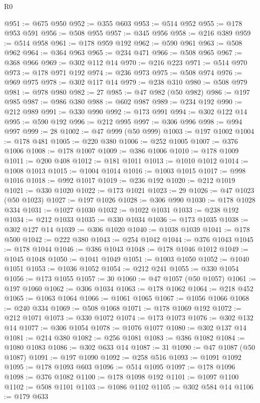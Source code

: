 \begin{lexlean}{R0}
\begin{coremodule}
@951 := @675 @950
@952 := @355 @603
@953 := @514 @952
@955 := @178 @953 @591
@956 := @508 @955
@957 := @345 @956
@958 := @216 @389
@959 := @514 @958
@961 := @178 @959 @192
@962 := @590 @961
@963 := @508 @962
@964 := @364 @963
@965 := @234 @471
@966 := @508 @965
@967 := @368 @966
@969 := @302 @112 @14
@970 := @216 @223
@971 := @514 @970
@973 := @178 @971 @192
@974 := @236 @973
@975 := @508 @974
@976 := @969 @975
@978 := @302 @117 @14
@979 := @238 @310
@980 := @508 @979
@981 := @978 @980
@982 := 27
@985 := @47 @982 (@50 @982)
@986 := @197 @985
@987 := @986 @380
@988 := @602 @987
@989 := @234 @192
@990 := @212 @989
@991 := @330 @990
@992 := @173 @991
@994 := @302 @122 @14
@995 := @590 @192
@996 := @212 @995
@997 := @306 @996
@998 := @994 @997
@999 := 28
@1002 := @47 @999 (@50 @999)
@1003 := @197 @1002
@1004 := @178 @481
@1005 := @220 @380
@1006 := @252 @1005
@1007 := @376 @1006
@1008 := @178 @1007
@1009 := @386 @1006
@1010 := @178 @1009
@1011 := @200 @408
@1012 := @181 @1011
@1013 := @1010 @1012
@1014 := @1008 @1013
@1015 := @1004 @1014
@1016 := @1003 @1015
@1017 := @998 @1016
@1018 := @992 @1017
@1019 := @236 @192
@1020 := @212 @1019
@1021 := @330 @1020
@1022 := @173 @1021
@1023 := 29
@1026 := @47 @1023 (@50 @1023)
@1027 := @197 @1026
@1028 := @306 @990
@1030 := @178 @1028 @334
@1031 := @1027 @1030
@1032 := @1022 @1031
@1033 := @238 @192
@1034 := @212 @1033
@1035 := @330 @1034
@1036 := @173 @1035
@1038 := @302 @127 @14
@1039 := @306 @1020
@1040 := @1038 @1039
@1041 := @178 @500
@1042 := @222 @380
@1043 := @254 @1042
@1044 := @376 @1043
@1045 := @178 @1044
@1046 := @386 @1043
@1048 := @178 @1046 @1012
@1049 := @1045 @1048
@1050 := @1041 @1049
@1051 := @1003 @1050
@1052 := @1040 @1051
@1053 := @1036 @1052
@1054 := @212 @241
@1055 := @330 @1054
@1056 := @173 @1055
@1057 := 30
@1060 := @47 @1057 (@50 @1057)
@1061 := @197 @1060
@1062 := @306 @1034
@1063 := @178 @1062
@1064 := @218 @452
@1065 := @1063 @1064
@1066 := @1061 @1065
@1067 := @1056 @1066
@1068 := @240 @334
@1069 := @508 @1068
@1071 := @178 @1069 @192
@1072 := @212 @1071
@1073 := @330 @1072
@1074 := @173 @1073
@1076 := @302 @132 @14
@1077 := @306 @1054
@1078 := @1076 @1077
@1080 := @302 @137 @14
@1081 := @214 @380
@1082 := @256 @1081
@1083 := @386 @1082
@1084 := @1080 @1083
@1086 := @302 @633 @14
@1087 := 31
@1090 := @47 @1087 (@50 @1087)
@1091 := @197 @1090
@1092 := @258 @516
@1093 := @1091 @1092
@1095 := @178 @1093 @603
@1096 := @514 @1095
@1097 := @178 @1096
@1098 := @376 @1082
@1100 := @178 @1098 @192
@1101 := @1097 @1100
@1102 := @508 @1101
@1103 := @1086 @1102
@1105 := @302 @584 @14
@1106 := @179 @633

\end{coremodule}
\end{lexlean}
